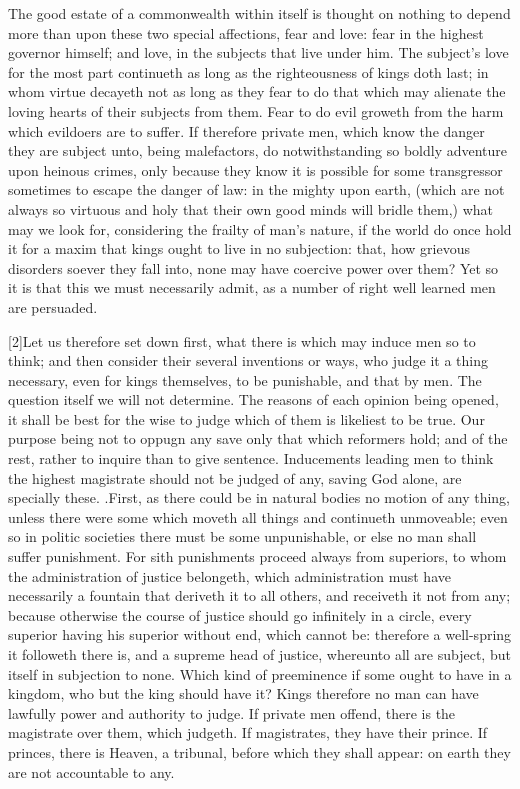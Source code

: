 The good estate of a commonwealth within itself is thought on nothing to depend more than upon these two special affections, fear and love: fear in the highest governor himself; and love, in the subjects that live under him. The subject’s love for the most part continueth as long as the righteousness of  kings doth last; in whom virtue decayeth not as long as they fear to do that which may alienate the loving hearts of their subjects from them. Fear to do evil groweth from the harm which evildoers are to suffer. If therefore private men, which know the danger they are subject unto, being malefactors, do notwithstanding so boldly adventure upon heinous crimes, only because they know it is possible for some transgressor sometimes to escape the danger of law: in the mighty upon earth, (which are not always so virtuous and holy that their own good minds will bridle them,) what may we look for, considering the frailty of man’s nature, if the world do once hold it for a maxim that kings ought to live in no subjection: that, how grievous disorders soever they fall into, none may have coercive power over them? Yet so it is that this we must necessarily admit, as a number of right well learned men are persuaded.

[2]Let us therefore set down first, what there is which may induce men so to think; and then consider their several inventions or ways, who judge it a thing necessary, even for kings themselves, to be punishable, and that by men. The question itself we will not determine. The reasons of each opinion being opened, it shall be best for the wise to judge which of them is likeliest to be true. Our purpose being not to oppugn any save only that which reformers hold; and of the rest, rather to inquire than to give sentence. Inducements leading men to think the highest magistrate should not be judged of any, saving God alone, are specially these. .First, as there could be in natural bodies no motion of any thing, unless there were some which moveth all things and continueth unmoveable; even so in politic societies there must be some unpunishable, or else no man shall suffer punishment. For sith punishments proceed always from superiors, to whom the administration of justice belongeth, which administration must have necessarily a fountain that deriveth it to all others, and receiveth it not from any; because otherwise the course of justice should go infinitely in a circle, every superior having his superior without end, which cannot be: therefore a well-spring it followeth there is, and a supreme head of justice,  whereunto all are subject, but itself in subjection to none. Which kind of preeminence if some ought to have in a kingdom, who but the king should have it? Kings therefore no man can have lawfully power and authority to judge. If private men offend, there is the magistrate over them, which judgeth. If magistrates, they have their prince. If princes, there is Heaven, a tribunal, before which they shall appear: on earth they are not accountable to any.

